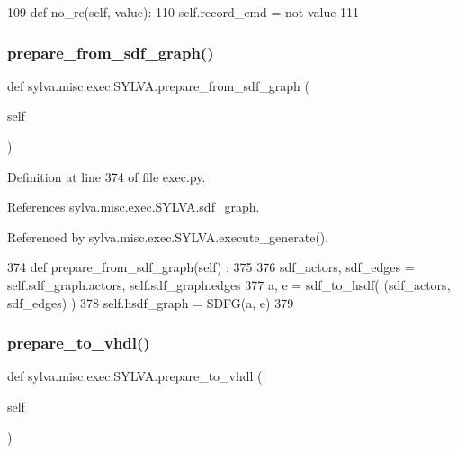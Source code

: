 \begin{DoxyCode}
109   \textcolor{keyword}{def }no\_rc(self, value):
110     self.record\_cmd = \textcolor{keywordflow}{not} value
111 
\end{DoxyCode}
\mbox{\label{classsylva_1_1misc_1_1exec_1_1_s_y_l_v_a_a67e8f5e9056dc12db86331eb50494e7c}} 
\subsubsection{\texorpdfstring{prepare\+\_\+from\+\_\+sdf\+\_\+graph()}{prepare\_from\_sdf\_graph()}}
{\footnotesize\ttfamily def sylva.\+misc.\+exec.\+S\+Y\+L\+V\+A.\+prepare\+\_\+from\+\_\+sdf\+\_\+graph (\begin{DoxyParamCaption}\item[{}]{self }\end{DoxyParamCaption})}



Definition at line 374 of file exec.\+py.



References sylva.\+misc.\+exec.\+S\+Y\+L\+V\+A.\+sdf\+\_\+graph.



Referenced by sylva.\+misc.\+exec.\+S\+Y\+L\+V\+A.\+execute\+\_\+generate().


\begin{DoxyCode}
374   \textcolor{keyword}{def }prepare\_from\_sdf\_graph(self) :
375 
376     sdf\_actors, sdf\_edges = self.sdf\_graph.actors, self.sdf\_graph.edges
377     a, e = sdf\_to\_hsdf( (sdf\_actors, sdf\_edges) )
378     self.hsdf\_graph = SDFG(a, e)
379 
\end{DoxyCode}
\mbox{\label{classsylva_1_1misc_1_1exec_1_1_s_y_l_v_a_a01eb55c566fcdf14c0aef3361b49f38d}} 
\subsubsection{\texorpdfstring{prepare\+\_\+to\+\_\+vhdl()}{prepare\_to\_vhdl()}}
{\footnotesize\ttfamily def sylva.\+misc.\+exec.\+S\+Y\+L\+V\+A.\+prepare\+\_\+to\+\_\+vhdl (\begin{DoxyParamCaption}\item[{}]{self }\end{DoxyParamCaption})}



